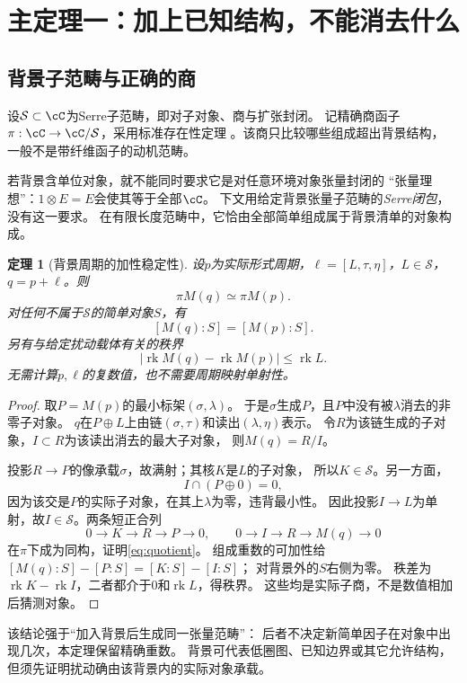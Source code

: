 \documentclass[11pt,a4paper]{ctexart}
\theoremstyle{cnplain}\newtheorem{theorem}{定理}[section]
\theoremstyle{definition}\newtheorem{definition}[theorem]{定义}
\theoremstyle{remark}\newtheorem{remark}[theorem]{注}
\newcommand{\cS}{\mathcal S}\newcommand{\dR}{\mathrm{dR}}
\newcommand{\rk}{\operatorname{rk}}\newcommand{\im}{\operatorname{im}}
\begin{document}
\section{主定理一：加上已知结构，不能消去什么}
\subsection{背景子范畴与正确的商}
设$\cS\subset\cC$为Serre子范畴，即对子对象、商与扩张封闭。
记精确商函子$\pi:\cC\to\cC/\cS$，采用标准存在性定理
\cite[Tag 02MS]{stacks}。该商只比较哪些组成超出背景结构，
一般不是带纤维函子的动机范畴。

若背景含单位对象，就不能同时要求它是对任意环境对象张量封闭的
“张量理想”：$1\otimes E=E$会使其等于全部$\cC$。
下文用给定背景张量子范畴的\emph{Serre闭包}，没有这一要求。
在有限长度范畴中，它恰由全部简单组成属于背景清单的对象构成。

\begin{theorem}[背景周期的加性稳定性]\label{thm:addition}
设$p$为实际形式周期，$\ell=[L,\tau,\eta]$，$L\in\cS$，
$q=p+\ell$。则
\begin{equation}\label{eq:quotient}
 \pi M(q)\simeq\pi M(p).
\end{equation}
对任何不属于$\cS$的简单对象$S$，有
\[
 [M(q):S]=[M(p):S].
\]
另有与给定扰动载体有关的秩界
\[
 |\rk M(q)-\rk M(p)|\leq\rk L .
\]
无需计算$p,\ell$的复数值，也不需要周期映射单射性。
\end{theorem}
\begin{proof}
取$P=M(p)$的最小标架$(\sigma,\lambda)$。
于是$\sigma$生成$P$，且$P$中没有被$\lambda$消去的非零子对象。
$q$在$P\oplus L$上由链$(\sigma,\tau)$和读出$(\lambda,\eta)$表示。
令$R$为该链生成的子对象，$I\subset R$为该读出消去的最大子对象，
则$M(q)=R/I$。

投影$R\to P$的像承载$\sigma$，故满射；其核$K$是$L$的子对象，
所以$K\in\cS$。另一方面，
\[
 I\cap(P\oplus0)=0,
\]
因为该交是$P$的实际子对象，在其上$\lambda$为零，违背最小性。
因此投影$I\to L$为单射，故$I\in\cS$。两条短正合列
\[
 0\to K\to R\to P\to0,\qquad
 0\to I\to R\to M(q)\to0
\]
在$\pi$下成为同构，证明\eqref{eq:quotient}。
组成重数的可加性给
$[M(q):S]-[P:S]=[K:S]-[I:S]$；
对背景外的$S$右侧为零。
秩差为$\rk K-\rk I$，二者都介于$0$和$\rk L$，得秩界。
这些均是实际子商，不是数值相加后猜测对象。
\end{proof}

该结论强于“加入背景后生成同一张量范畴”：
后者不决定新简单因子在对象中出现几次，本定理保留精确重数。
背景可代表低圈图、已知边界或其它允许结构，
但须先证明扰动确由该背景内的实际对象承载。
\end{document}
